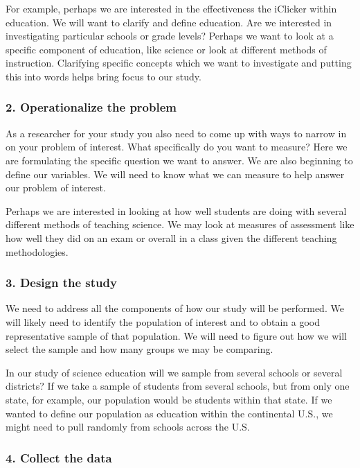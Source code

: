 \documentclass[11pt, chapterprefix=true]{scrbook}\usepackage[]{graphicx}\usepackage[]{color}
\begin{document}
For example, perhaps we are interested in the effectiveness the iClicker within education.  We will want to clarify and define education.  Are we interested in investigating particular schools or grade levels?  Perhaps we want to look at a specific component of education, like science or look at different methods of instruction.   Clarifying specific concepts which we want to investigate and putting this into words helps bring focus to our study.

\subsubsection{2. Operationalize the problem}

As a researcher for your study you also need to come up with ways to narrow in on your problem of interest.  What specifically do you want to measure?  Here we are formulating the specific question we want to answer.  We are also beginning to define our variables.  We will need to know what we can measure to help answer our problem of interest.

Perhaps we are interested in looking at how well students are doing with several different methods of teaching science.  We may look at measures of assessment like how well they did on an exam or overall in a class given the different teaching methodologies.

\subsubsection{3. Design the study}

We need to address all the components of how our study will be performed.  We will likely need to identify the population of interest and to obtain a good representative sample of that population.  We will need to figure out how we will select the sample and how many groups we may be comparing.

In our study of science education will we sample from several schools or several districts?  If we take a sample of students from several schools, but from only one state, for example, our population would be students within that state.  If we wanted to define our population as education within the continental U.S., we might need to pull randomly from schools across the U.S.

\subsubsection{4. Collect the data}
\end{document}
